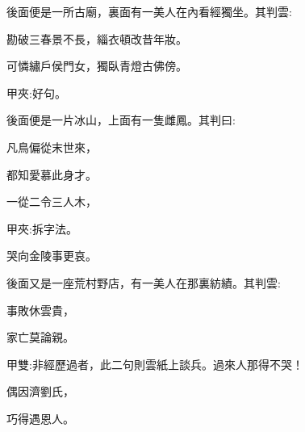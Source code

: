 \begin{parag}
    後面便是一所古廟，裏面有一美人在內看經獨坐。其判雲:
\end{parag}


\begin{poem}
    \begin{pl}勘破三春景不長，緇衣頓改昔年妝。\end{pl}

    \begin{pl}可憐繡戶侯門女，獨臥青燈古佛傍。\end{pl}
    \begin{note}甲夾:好句。\end{note}
\end{poem}


\begin{parag}
    後面便是一片冰山，上面有一隻雌鳳。其判曰:
\end{parag}


\begin{poem}
    \begin{pl}凡鳥偏從末世來，\end{pl}

    \begin{pl}都知愛慕此身才。\end{pl}

    \begin{pl}一從二令三人木，\end{pl}\begin{note}甲夾:拆字法。\end{note}

    \begin{pl}哭向金陵事更哀。\end{pl}
\end{poem}


\begin{parag}
    後面又是一座荒村野店，有一美人在那裏紡績。其判雲:
\end{parag}


\begin{poem}
    \begin{pl}事敗休雲貴，\end{pl}

    \begin{pl}家亡莫論親。\end{pl}\begin{note}甲雙:非經歷過者，此二句則雲紙上談兵。過來人那得不哭！\end{note}

    \begin{pl}偶因濟劉氏，\end{pl}

    \begin{pl}巧得遇恩人。\end{pl}

\end{poem}


